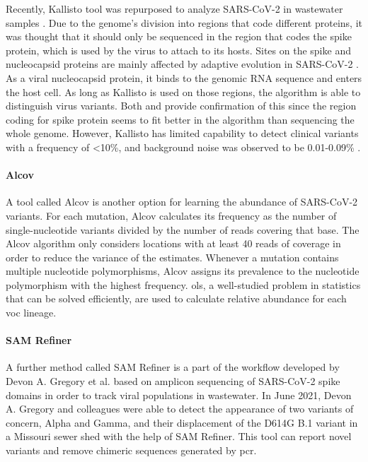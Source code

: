         Recently, Kallisto tool was repurposed to analyze SARS-CoV-2 in wastewater samples \cite{baaijens2021,kallisto2022}. Due to the genome's division into regions that code different proteins, it was thought that it should only be sequenced in the region that codes the spike protein, which is used by the virus to attach to its hosts. Sites on the spike and nucleocapsid proteins are mainly affected by adaptive evolution in SARS-CoV-2 \cite{rochman2021}. As a viral nucleocapsid protein, it binds to the genomic RNA sequence and enters the host cell. As long as Kallisto is used on those regions, the algorithm is able to distinguish virus variants. Both \cite{baaijens2021} and \cite{anton2022} provide confirmation of this since the region coding for spike protein seems to fit better in the algorithm than sequencing the whole genome. However, Kallisto has limited capability to detect clinical variants with a frequency of <10\%, and background noise was observed to be 0.01-0.09\% \cite{baaijens2021}.
        \paragraph{Alcov}
        A tool called Alcov \cite{ellmen2021} is another option for learning the abundance of SARS-CoV-2 variants. For each mutation, Alcov calculates its frequency as the number of single-nucleotide variants divided by the number of reads covering that base. The Alcov algorithm only considers locations with at least 40 reads of coverage in order to reduce the variance of the estimates. Whenever a mutation contains multiple nucleotide polymorphisms, Alcov assigns its prevalence to the nucleotide polymorphism with the highest frequency. \acrfull{ols}, a well-studied problem in statistics that can be solved efficiently, are used to calculate relative abundance for each \acrfull{voc} lineage. 
        \paragraph{SAM Refiner}
        A further method called SAM Refiner is a part of the workflow developed by Devon A. Gregory et al. \cite{gregory2021} based on amplicon sequencing of SARS-CoV-2 spike domains in order to track viral populations in wastewater. In June 2021, Devon A. Gregory and colleagues were able to detect the appearance of two variants of concern, Alpha and Gamma, and their displacement of the D614G B.1 variant in a Missouri sewer shed with the help of SAM Refiner. This tool can report novel variants and remove chimeric sequences generated by \acrshort{pcr}. 
        
